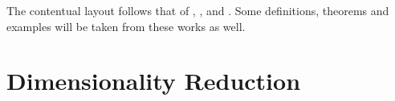 The contentual layout follows that of \cite{Coifman20065}, \cite{Nadler2006113}, \cite{Nadler2008} and \cite{Belkin2003}. Some definitions, theorems and examples will be taken from these works as well.

\section{Dimensionality Reduction}